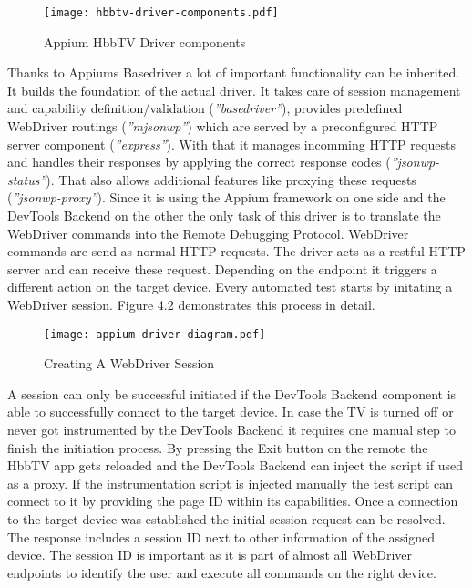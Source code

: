 \vspace{1cm}
\begin{figure}[htb]
  \centering
  \texttt{[image: hbbtv-driver-components.pdf]}\\
  \caption{Appium HbbTV Driver components}\label{fig:hbbtv-driver-components}
\end{figure}
\vspace{0.5cm}

Thanks to Appiums Basedriver a lot of important functionality can be inherited. It builds the foundation of the actual driver. It takes care of session management and capability definition/validation (\textit{''basedriver''}), provides predefined WebDriver routings (\textit{''mjsonwp''}) which are served by a preconfigured HTTP server component (\textit{''express''}). With that it manages incomming HTTP requests and handles their responses by applying the correct response codes (\textit{''jsonwp-status''}). That also allows additional features like proxying these requests (\textit{''jsonwp-proxy''}). Since it is using the Appium framework on one side and the DevTools Backend on the other the only task of this driver is to translate the WebDriver commands into the Remote Debugging Protocol. WebDriver commands are send as normal HTTP requests. The driver acts as a restful HTTP server and can receive these request. Depending on the endpoint it triggers a different action on the target device. Every automated test starts by initating a WebDriver session. Figure 4.2 demonstrates this process in detail.

\vspace{1cm}
\begin{figure}[htb]
  \centering
  \texttt{[image: appium-driver-diagram.pdf]}\\
  \caption{Creating A WebDriver Session}\label{fig:appium-driver-diagram}
\end{figure}
\vspace{0.5cm}

A session can only be successful initiated if the DevTools Backend component is able to successfully connect to the target device. In case the TV is turned off or never got instrumented by the DevTools Backend it requires one manual step to finish the initiation process. By pressing the Exit button on the remote the HbbTV app gets reloaded and the DevTools Backend can inject the script if used as a proxy. If the instrumentation script is injected manually the test script can connect to it by providing the page ID within its capabilities. Once a connection to the target device was established the initial session request can be resolved. The response includes a session ID next to other information of the assigned device. The session ID is important as it is part of almost all WebDriver endpoints to identify the user and execute all commands on the right device.

